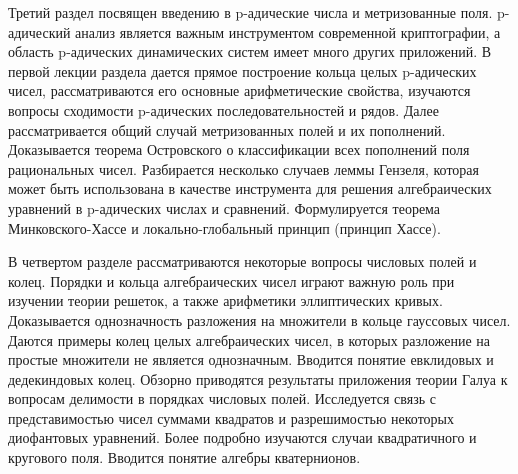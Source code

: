 \documentclass[a4paper, 12pt]{article}
\begin{document}
Третий раздел посвящен введению в p-адические числа и метризованные поля. p-адический анализ является важным инструментом современной криптографии, а область p-адических динамических систем имеет много других приложений. В первой лекции раздела дается прямое построение кольца целых p-адических чисел, рассматриваются его основные арифметические свойства, изучаются вопросы сходимости p-адических последовательностей и рядов. Далее рассматривается общий случай метризованных полей и их пополнений. Доказывается теорема Островского о классификации всех пополнений поля рациональных чисел. Разбирается несколько случаев леммы Гензеля, которая может быть использована в качестве инструмента для решения алгебраических уравнений в p-адических числах и сравнений. Формулируется теорема Минковского-Хассе и локально-глобальный принцип (принцип Хассе).

В четвертом разделе рассматриваются некоторые вопросы числовых полей и колец. Порядки и кольца алгебраических чисел играют важную роль при изучении теории решеток, а также арифметики эллиптических кривых. Доказывается однозначность разложения на множители в кольце гауссовых чисел. Даются примеры колец целых алгебраических чисел, в которых разложение на простые множители не является однозначным. Вводится понятие евклидовых и дедекиндовых колец. Обзорно приводятся результаты приложения теории Галуа к вопросам делимости в порядках числовых полей. Исследуется связь с представимостью чисел суммами квадратов и разрешимостью некоторых диофантовых уравнений. Более подробно изучаются случаи квадратичного и кругового поля. Вводится понятие алгебры кватернионов.


\vspace{8pt}
\end{document}
